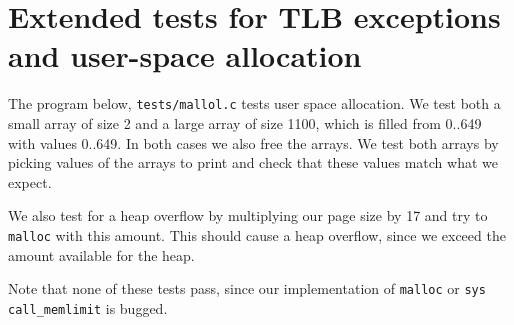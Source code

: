 \documentclass[a4paper,12pt]{article}
\begin{document}


\section{Extended tests for TLB exceptions and user-space allocation}

The program below, \texttt{tests/mallol.c} tests user space allocation. We test both a small array of size 2 and a large array of size 1100, which is filled from 0..649 with values 0..649. In both cases we also free the arrays. We test both arrays by picking values of the arrays to print and check that these values match what we expect.


We also test for a heap overflow by multiplying our page size by 17 and try to \texttt{malloc} with this amount. This should cause a heap overflow, since we exceed the amount available for the heap.


Note that none of these tests pass, since our implementation of \texttt{malloc} or \texttt{sys call\_memlimit} is bugged.
\end{document}
